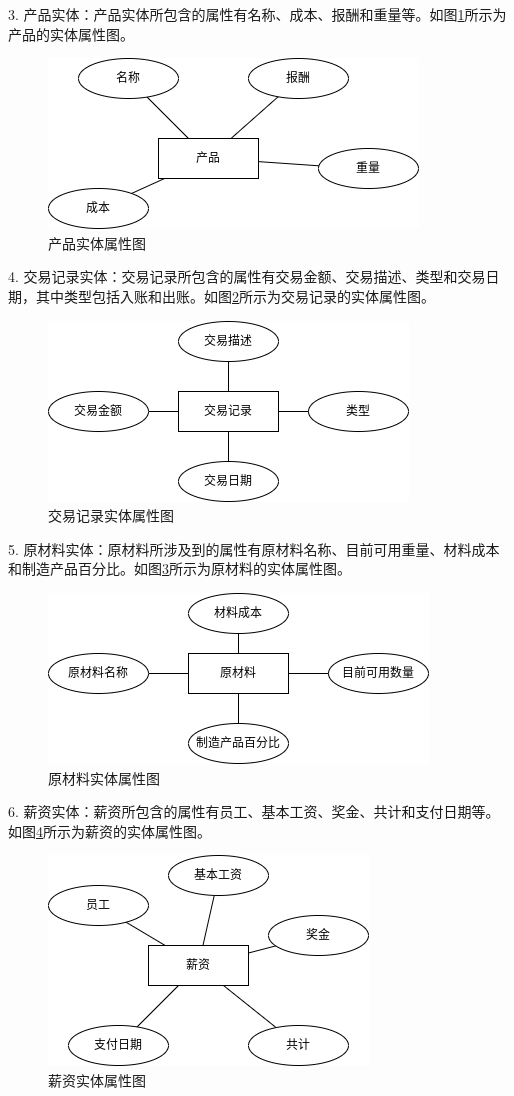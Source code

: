 3. 产品实体：产品实体所包含的属性有名称、成本、报酬和重量等。如图\ref{fig:4prdcterf}所示为产品的实体属性图。

\begin{figure}[H]
    \centering
    \includegraphics[width=.45\textwidth]{figures/4prdcterf.png}
    \caption{产品实体属性图}
    \label{fig:4prdcterf}
\end{figure}

4. 交易记录实体：交易记录所包含的属性有交易金额、交易描述、类型和交易日期，其中类型包括入账和出账。如图\ref{fig:4tscterf}所示为交易记录的实体属性图。

\begin{figure}[H]
    \centering
    \includegraphics[width=.45\textwidth]{figures/4tscterf.png}
    \caption{交易记录实体属性图}
    \label{fig:4tscterf}
\end{figure}

5. 原材料实体：原材料所涉及到的属性有原材料名称、目前可用重量、材料成本和制造产品百分比。如图\ref{fig:4rmtraerf}所示为原材料的实体属性图。

\begin{figure}[H]
    \centering
    \includegraphics[width=.45\textwidth]{figures/4rmtraerf.png}
    \caption{原材料实体属性图}
    \label{fig:4rmtraerf}
\end{figure}

6. 薪资实体：薪资所包含的属性有员工、基本工资、奖金、共计和支付日期等。如图\ref{fig:4slrerf}所示为薪资的实体属性图。

\begin{figure}[H]
    \centering
    \includegraphics[width=.45\textwidth]{figures/4slrerf.png}
    \caption{薪资实体属性图}
    \label{fig:4slrerf}
\end{figure}

